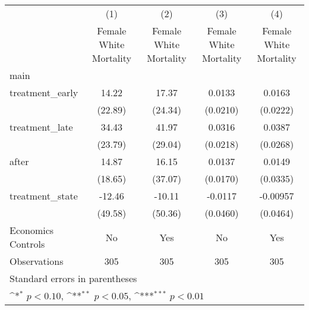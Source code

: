 {
\def\sym#1{\ifmmode^{#1}\else\(^{#1}\)\fi}
\begin{longtable}{l*{4}{c}}
\hline\hline\endfirsthead\hline\endhead\hline\endfoot\endlastfoot
                    &\multicolumn{1}{c}{(1)}&\multicolumn{1}{c}{(2)}&\multicolumn{1}{c}{(3)}&\multicolumn{1}{c}{(4)}\\
                    &\multicolumn{1}{c}{Female White Mortality}&\multicolumn{1}{c}{Female White Mortality}&\multicolumn{1}{c}{Female White Mortality}&\multicolumn{1}{c}{Female White Mortality}\\
\hline
main                &                     &                     &                     &                     \\
treatment\_early     &       14.22         &       17.37         &      0.0133         &      0.0163         \\
                    &     (22.89)         &     (24.34)         &    (0.0210)         &    (0.0222)         \\
[1em]
treatment\_late      &       34.43         &       41.97         &      0.0316         &      0.0387         \\
                    &     (23.79)         &     (29.04)         &    (0.0218)         &    (0.0268)         \\
[1em]
after               &       14.87         &       16.15         &      0.0137         &      0.0149         \\
                    &     (18.65)         &     (37.07)         &    (0.0170)         &    (0.0335)         \\
[1em]
treatment\_state     &      -12.46         &      -10.11         &     -0.0117         &    -0.00957         \\
                    &     (49.58)         &     (50.36)         &    (0.0460)         &    (0.0464)         \\
[1em]
Economics Controls  &          No         &         Yes         &          No         &         Yes         \\
\hline
Observations        &         305         &         305         &         305         &         305         \\
\hline\hline
\multicolumn{5}{l}{\footnotesize Standard errors in parentheses}\\
\multicolumn{5}{l}{\footnotesize \sym{*} \(p<0.10\), \sym{**} \(p<0.05\), \sym{***} \(p<0.01\)}\\
\end{longtable}
}
